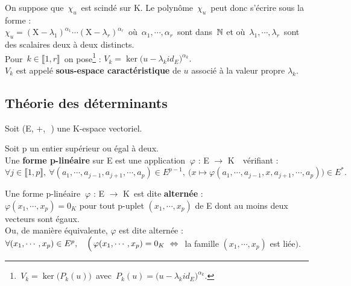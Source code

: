 \newpage

On suppose que \(\,\chi_u\,\) est scindé sur K. Le polynôme \(\,\chi_u\,\) peut donc s'écrire sous la forme :\vspace{0.1cm}\\
\(\displaystyle \chi_u=(\text{X}-\lambda_1)^{\alpha_1}\cdots(\text{X}-\lambda_r)^{\alpha_r}\,\) où \(\,\alpha_1,\cdots,\alpha_r\,\) sont dans \(\,\mathbb{N}\)\expo{*} et où \(\,\lambda_1,\cdots,\lambda_r\,\) sont des scalaires deux à deux distincts.\vspace{0.1cm}\\
Pour \(\,k\in \llbracket 1,r \rrbracket\,\) on pose\footnote{\(\, V_k=\ker\bigl(P_k(u)\bigr)\,\) avec \(\displaystyle \, P_k (u)= \bigl( u-\lambda_kid_E\bigr)^{\alpha_k}\).} : \(\displaystyle V_k = \ker\bigl(u-\lambda_kid_E\bigr)^{\alpha_k}.\)\vspace{0.1cm}\\
$V_k$ est appelé \textbf{sous-espace caractéristique} de $u$ associé à la valeur propre $\lambda_k$.

\vspace{2cm}

\subsection{Théorie des déterminants}

\vspace{0.7cm}

\begin{center}
    Soit (E, +,\ \lce\,) une K-espace vectoriel.
\end{center}

\vspace{1cm}

Soit p un entier supérieur ou égal à deux.\\
Une \textbf{forme p-linéaire} sur E est une application \(\ \varphi \) : E \(\to\) K\ \ vérifiant :\vspace{0.1cm}\\
\(\forall j\in \llbracket 1,p \rrbracket,\ \forall (a_1,\cdots,a_{j-1},a_{j+1},\cdots,a_p)\in E^{p-1},\ \bigl( x\mapsto \varphi(a_1,\cdots,a_{j-1}, x,a_{j+1},\cdots,a_p) \bigr) \in E^*. \)

\vspace{1.5cm}

Une forme p-linéaire \(\ \varphi \) : E \(\to\) K\ est dite \textbf{alternée} \ssi :\\
\( \varphi(x_1,\cdots, x_p)=0_K  \) pour tout p-uplet \((x_1,\cdots, x_p)\) de E dont au moins deux vecteurs sont égaux.\vspace{0.5cm}\\
Ou, de manière équivalente, $\varphi$ est dite alternée \ssi :\vspace{0.1cm}\\
\(\forall(x_1,\cdots,x_p)\in E^p,\quad \Bigl(\,\varphi(x_1,\cdots,x_p)=0_K \ \Leftrightarrow \ \) la famille $(x_1,\cdots,x_p)$ est liée$\Bigr)$. 


